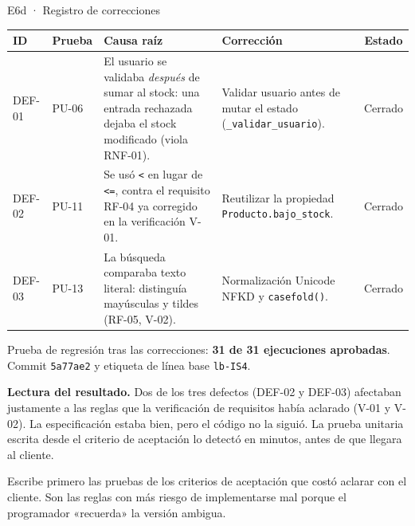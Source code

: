 \documentclass[11pt,a4paper]{article}
\newcommand{\cod}[1]{\texttt{\small #1}}
\begin{document}
\begin{evidencia}{E6d · Registro de correcciones}
\small
\begin{tabularx}{\linewidth}{@{}l l L L c@{}}
\toprule
\textbf{ID} & \textbf{Prueba} & \textbf{Causa raíz} & \textbf{Corrección} & \textbf{Estado} \\
\midrule
DEF-01 & PU-06 & El usuario se validaba \emph{después} de sumar al stock: una entrada rechazada dejaba el stock modificado (viola RNF-01). & Validar usuario antes de mutar el estado (\cod{\_validar\_usuario}). & Cerrado \\
DEF-02 & PU-11 & Se usó \cod{<} en lugar de \cod{<=}, contra el requisito RF-04 ya corregido en la verificación V-01. & Reutilizar la propiedad \cod{Producto.bajo\_stock}. & Cerrado \\
DEF-03 & PU-13 & La búsqueda comparaba texto literal: distinguía mayúsculas y tildes (RF-05, V-02). & Normalización Unicode NFKD y \cod{casefold()}. & Cerrado \\
\bottomrule
\end{tabularx}

\vspace{0.2cm}
Prueba de regresión tras las correcciones: \textbf{31 de 31 ejecuciones aprobadas}. Commit \cod{5a77ae2} y etiqueta de línea base \cod{lb-IS4}.
\end{evidencia}

\noindent\textbf{Lectura del resultado.} Dos de los tres defectos (DEF-02 y DEF-03) afectaban justamente a las reglas que la verificación de requisitos había aclarado (V-01 y V-02). La especificación estaba bien, pero el código no la siguió. La prueba unitaria escrita desde el criterio de aceptación lo detectó en minutos, antes de que llegara al cliente.

\begin{consejo}
Escribe primero las pruebas de los criterios de aceptación que costó aclarar con el cliente. Son las reglas con más riesgo de implementarse mal porque el programador «recuerda» la versión ambigua.
\end{consejo}

\end{document}
